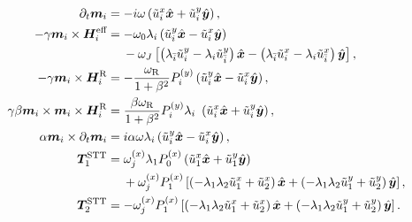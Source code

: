 \begin{subequations}
\label{eq:LLGS_Fourier_terms}
\begin{align}
    \partial_t\mathbold{m}_i &= -i\omega\left( \tilde{u}^x_i\mathbold{\hat{x}} + \tilde{u}^y_i \mathbold{\hat{y}} \right), \label{eq:LLGS_linear_u}\\
    \nonumber -\gamma\mathbold{m}_i\times\mathbold{H}^{\text{eff}}_i &= - \omega_0\lambda_i\left( \tilde{u}^y_i\mathbold{\hat{x}} - \tilde{u}^x_i \mathbold{\hat{y}} \right) \\
    &\hspace{4.5mm }- \omega_J\left[ \left(\lambda_{\bar{i}}\tilde{u}^y_i-\lambda_i\tilde{u}^y_{\bar{i}}\right)\mathbold{\hat{x}} - \left(\lambda_{\bar{i}}\tilde{u}^x_i-\lambda_i\tilde{u}^x_{\bar{i}}\right)\mathbold{\hat{y}} \right], \\
    -\gamma\mathbold{m}_i\times \mathbold{H}^{\text{R}}_i &= -\frac{\omega_{\text{R}}}{1+\beta^2} P^{(y)}_i \left( \tilde{u}^y_i\mathbold{\hat{x}} - \tilde{u}^x_i \mathbold{\hat{y}} \right), \label{eq:LLGS_cross_u} \\
    \gamma\beta\mathbold{m}_i\times\mathbold{m}_i\times\mathbold{H}^{\text{R}}_i &= \frac{\beta\omega_{\text{R}}}{1+\beta^2} P^{(y)}_i \lambda_i\ \left( \tilde{u}^x_i\mathbold{\hat{x}} + \tilde{u}^y_i\mathbold{\hat{y}} \right), \\
    \alpha\mathbold{m}_i\times\partial_t\mathbold{m}_i &= i\alpha \omega \lambda_i \left( \tilde{u}^y_i\mathbold{\hat{x}} - \tilde{u}^x_i \mathbold{\hat{y}} \right), \\
    \nonumber \mathbold{T}^{\text{STT}}_1 &= \omega^{(x)}_j \lambda_1 P^{(x)}_0 \left( \tilde{u}^x_1\mathbold{\hat{x}} + \tilde{u}^y_1 \mathbold{\hat{y}} \right) \\
    &\hspace{4.5mm} +\omega^{(x)}_jP^{(x)}_1\left[\left(-\lambda_1\lambda_2\tilde{u}^x_1+ \tilde{u}^x_{2}\right)\mathbold{\hat{x}} + \left(-\lambda_1\lambda_2\tilde{u}^y_1+ \tilde{u}^y_{2}\right)\mathbold{\hat{y}}\right], \\
    \mathbold{T}^{\text{STT}}_2 &= -\omega^{(x)}_jP^{(x)}_1\left[\left(-\lambda_1\lambda_2\tilde{u}^x_1+ \tilde{u}^x_{2}\right)\mathbold{\hat{x}} + \left(-\lambda_1\lambda_2\tilde{u}^y_1+ \tilde{u}^y_{2}\right)\mathbold{\hat{y}}\right].
\end{align}
\end{subequations}

